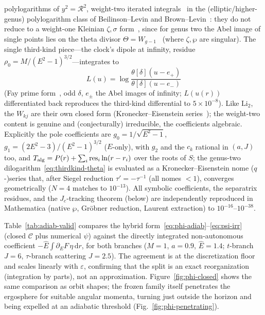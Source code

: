 \documentclass[
    aps, prd, twocolumn, superscriptaddress,
    showpacs, nofootinbib, floatfix
]{revtex4-2}
\newcommand{\Ehat}{\hat E}
\newcommand{\Jc}{J_{c}}
\newcommand{\dd}{\mathrm{d}}
\begin{document}
polylogarithms of $y^2=\mathcal{R}^2$, weight-two iterated
integrals~\cite{Chen1977} in the (elliptic/higher-genus) polylogarithm class of
Beilinson--Levin and Brown--Levin~\cite{BeilinsonLevin1994,BrownLevin2011}: they do
not reduce to a weight-one Kleinian $\zeta,\sigma$
form~\cite{BakerAbelian1897,BuchstaberEnolskii1997}, since for genus two the Abel
image of single points lies on the theta divisor $\Theta=W_{g-1}$~\cite{MumfordTata}
(where $\zeta,\wp$ are singular). The single third-kind piece---the clock's dipole at
infinity, residue $\rho_0=M/(E^2-1)^{3/2}$---integrates to
\begin{equation}
    L(u)=\log\frac{\theta[\delta](u-e_+)}{\theta[\delta](u-e_-)}
    \label{eq:thirdkind-theta}
\end{equation}
(Fay prime form~\cite{Fay1973}, odd $\delta$, $e_\pm$ the Abel images of infinity;
$L(u(r))$ differentiated back reproduces the third-kind differential to
$5\times10^{-8}$). Like $\mathrm{Li}_2$, the $W_{kj}$ are their own closed form
(Kronecker--Eisenstein series~\cite{BeilinsonLevin1994}); the weight-two content is genuine and (conjecturally) irreducible, the coefficients
algebraic. Explicitly the pole coefficients are $g_0=1/\sqrt{E^2-1}$,
$g_1=(2E^2-3)/(E^2-1)^{3/2}$ ($E$-only), with $g_2$ and the $c_k$ rational in
$(a,J)$ too, and $T_{\rm alg}=P(r)+\sum_i\mathrm{res}_i\ln(r-r_i)$ over the roots of
$S$; the genus-two dilogarithm~\eqref{eq:thirdkind-theta} is evaluated as a
Kronecker--Eisenstein nome ($q$-)series that, after Siegel reduction $\tau'=-\tau^{-1}$
(all nomes ${<}1$), converges geometrically ($N{=}4$ matches to $10^{-13}$). All symbolic coefficients,
the separatrix residues, and the $\Jc$-tracking theorem (below) are independently
reproduced in Mathematica (native $\wp$, Gröbner reduction, Laurent extraction) to
$10^{-16}$--$10^{-38}$.

Table~\ref{tab:adiab-valid} compares the hybrid
form~\eqref{eq:phi-adiab}--\eqref{eq:psi-irr} (closed $\mathcal{C}$ plus numerical
$\psi$) against the directly integrated non-autonomous coefficient
$-\Ehat\!\int\partial_E F\,\eta\,\dd r$, for both branches ($M=1$, $a=0.9$,
$\Ehat=1.4$; $t$-branch $J=6$, $\tau$-branch scattering $J=2.5$). The agreement is
at the discretization floor and scales linearly with $\varepsilon$, confirming
that the split is an exact reorganization (integration by parts), not an
approximation. Figure~\ref{fig:phi-closed} shows the same comparison as orbit
shapes; the frozen family itself penetrates the ergosphere for suitable angular
momenta, turning just outside the horizon and being expelled at an adiabatic
threshold (Fig.~\ref{fig:phi-penetrating}).
\end{document}
